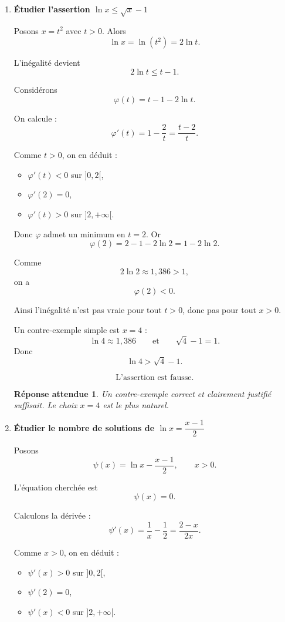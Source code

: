 \documentclass[11pt,a4paper]{article}
\newtheorem*{reponseattendue}{Réponse attendue}
\begin{document}
\begin{enumerate}[label=\textbf{1.\arabic*}, resume, leftmargin=1.6em]

\item \textbf{Étudier l’assertion \(\ln x\le \sqrt{x}-1\)}

Posons \(x=t^2\) avec \(t>0\). Alors
\[
\ln x=\ln(t^2)=2\ln t.
\]

L’inégalité devient
\[
2\ln t\le t-1.
\]

Considérons
\[
\varphi(t)=t-1-2\ln t.
\]

On calcule :
\[
\varphi'(t)=1-\frac{2}{t}=\frac{t-2}{t}.
\]

Comme \(t>0\), on en déduit :
\begin{itemize}
    \item \(\varphi'(t)<0\) sur \(]0,2[\),
    \item \(\varphi'(2)=0\),
    \item \(\varphi'(t)>0\) sur \(]2,+\infty[\).
\end{itemize}

Donc \(\varphi\) admet un minimum en \(t=2\). Or
\[
\varphi(2)=2-1-2\ln 2=1-2\ln 2.
\]

Comme
\[
2\ln 2\approx 1{,}386>1,
\]
on a
\[
\varphi(2)<0.
\]

Ainsi l’inégalité n’est pas vraie pour tout \(t>0\), donc pas pour tout \(x>0\).

Un contre-exemple simple est \(x=4\) :
\[
\ln 4\approx 1{,}386
\qquad\text{et}\qquad
\sqrt4-1=1.
\]
Donc
\[
\ln 4>\sqrt4-1.
\]

\[
\boxed{\text{L’assertion est fausse.}}
\]

\begin{reponseattendue}
Un contre-exemple correct et clairement justifié suffisait. Le choix \(x=4\) est le plus naturel.
\end{reponseattendue}

\item \textbf{Étudier le nombre de solutions de \(\ln x=\dfrac{x-1}{2}\)}

Posons
\[
\psi(x)=\ln x-\frac{x-1}{2},
\qquad x>0.
\]

L’équation cherchée est
\[
\psi(x)=0.
\]

Calculons la dérivée :
\[
\psi'(x)=\frac1x-\frac12=\frac{2-x}{2x}.
\]

Comme \(x>0\), on en déduit :
\begin{itemize}
    \item \(\psi'(x)>0\) sur \(]0,2[\),
    \item \(\psi'(2)=0\),
    \item \(\psi'(x)<0\) sur \(]2,+\infty[\).
\end{itemize}


\end{enumerate}
\end{document}
